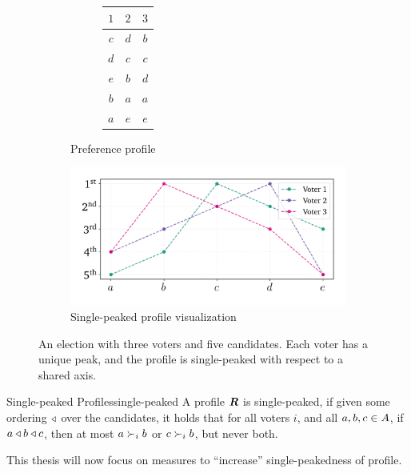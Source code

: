 \begin{figure}[ht]
	\centering
	\begin{subfigure}[b]{0.3\textwidth}
		\centering
		\begin{subfigure}[b]{0.3\textwidth}
			\centering
			\begin{tabular}{ccc}
				\toprule
				$1$ & $2$ & $3$ \\
				\midrule
				$c$ & $d$ & $b$ \\
				$d$ & $c$ & $c$ \\
				$e$ & $b$ & $d$ \\
				$b$ & $a$ & $a$ \\
				$a$ & $e$ & $e$ \\
				\bottomrule
			\end{tabular}
			\vspace{2.8em}
		\end{subfigure}
		\caption{Preference profile}\label{tab:corresponding_profile}
	\end{subfigure}
	\hfill
	\begin{subfigure}[b]{0.65\textwidth}
		\centering
		\includegraphics[width=\textwidth]{Figures/single_peak_vis.png}
		\caption{Single-peaked profile visualization}\label{fig:singlepeaked_vis}
	\end{subfigure}
	\caption{An election with three voters and five candidates. Each voter has a unique peak, and the profile is single-peaked with respect to a shared axis.}
	\label{fig:singlepeaked_full}
\end{figure}
\begin{definition}{Single-peaked Profiles}{single-peaked}
	A profile $\boldsymbol{R}$ is single-peaked, if given some ordering
	$\triangleleft$ over the candidates, it holds that for all voters $i$, and
	all $a, b, c \in A$, if $a \triangleleft b \triangleleft c$, then
	at most $a \succ_i b$ or $c \succ_i b$, but never both.
\end{definition}

This thesis will now focus on measures to ``increase'' single-peakedness of profile.




